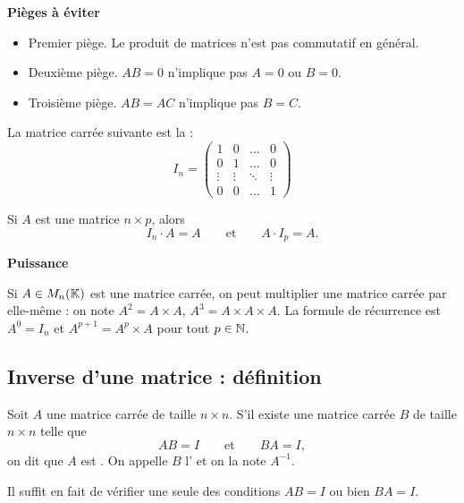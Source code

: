 \documentclass[10pt,class=article,crop=false]{standalone}
\begin{document}
\begin{multicols}{2}
\textbf{Pièges à éviter}

\begin{itemize}
	\item Premier piège. Le produit de matrices n'est pas commutatif en général.
    \item Deuxième piège. $AB=0$ n'implique pas $A=0$ ou $B=0$.
    \item Troisième piège. $AB=AC$ n'implique pas $B=C$.
\end{itemize}



La matrice carrée suivante est la  :
\[
I_n = \left(
\begin{array}{cccc}
	1 & 0 & \dots & 0\\
	0& 1& \dots & 0\\
	\vdots& \vdots & \ddots  & \vdots\\
	0 & 0 & \dots &1
\end{array}
\right)
\]

\begin{proposition}
	Si $A$ est une matrice $n \times p$, alors
	$$ I_n \cdot A = A \qquad \text{et} \qquad A \cdot I_p = A.$$
\end{proposition}


\textbf{Puissance}

Si $A \in M_n(\mathbb{K})$ est une matrice carrée, on peut multiplier une matrice carrée par elle-même : on note $A^2 = A \times A$, $A^3 = A \times A \times A$.
La formule de récurrence est $A^0=I_n$ et $A^{p+1}=A^p \times A$ pour tout $p\in\mathbb{N}$.


\subsection{Inverse d'une matrice : définition}

\begin{definition}
	Soit $A$ une matrice  carrée de taille $n \times n$. S'il existe une matrice carrée
	$B$ de taille $n \times n$ telle que
	$$ AB = I\qquad \text{et} \qquad BA = I, $$
	on dit que $A$ est . On appelle $B$ l'
	et on la note $A^{-1}$.
\end{definition}

Il suffit en fait de vérifier une seule des
conditions $AB=I$ ou bien $BA=I$.


\end{multicols}
\end{document}
